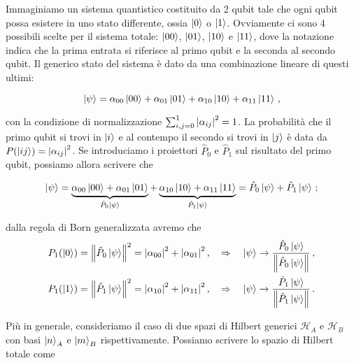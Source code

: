 \begin{esempio}
    Immaginiamo un sistema quantistico costituito da 2 qubit tale che ogni qubit possa esistere in uno stato differente, ossia $\ket{0}$ o $\ket{1}$. Ovviamente ci sono 4 possibili scelte per il sistema totale: $\ket{00}$, $\ket{01}$, $\ket{10}$ e $\ket{11}$, dove la notazione indica che la prima entrata si riferisce al primo qubit e la seconda al secondo qubit. Il generico stato del sistema è dato da una combinazione lineare di questi ultimi:
    
    \begin{equation*}
        \ket{\psi} = \alpha_{00} \ket{00} + \alpha_{01} \ket{01} + \alpha_{10} \ket{10} + \alpha_{11} \ket{11} \, ,
    \end{equation*}
    
    \noindent con la condizione di normalizzazione $\sum_{i,j=0}^1 \abs{\alpha_{ij}}^2 = 1$. La probabilità che il primo qubit si trovi in $\ket{i}$ e al contempo il secondo si trovi in $\ket{j}$ è data da $P(\ket{ij}) = \abs{\alpha_{ij}}^2$. Se introduciamo i proiettori $\hat{P}_0$ e $\hat{P}_1$ sul risultato del primo qubit, possiamo allora scrivere che
    
    \begin{equation*}
        \ket{\psi} = \underbrace{\alpha_{00} \ket{00} + \alpha_{01} \ket{01}}_{\hat{P}_0 \ket{\psi}} + \underbrace{\alpha_{10} \ket{10} + \alpha_{11} \ket{11}}_{\hat{P}_1 \ket{\psi}} = \hat{P}_0 \ket{\psi} + \hat{P}_1 \ket{\psi} \, ;
    \end{equation*}
    
        \noindent dalla regola di Born generalizzata avremo che
        \begin{align*}
            P_1(\ket{0}) &= \norm{\hat{P}_0 \ket{\psi}}^2 = \abs{\alpha_{00}}^2 + \abs{\alpha_{01}}^2 \, , \quad \Rightarrow \quad \ket{\psi} \rightarrow \frac{\hat{P}_0 \ket{\psi}}{\norm{\hat{P}_0 \ket{\psi}}} \, , \\
            P_1(\ket{1}) &= \norm{\hat{P}_1 \ket{\psi}}^2 = \abs{\alpha_{10}}^2 + \abs{\alpha_{11}}^2 \, , \quad \Rightarrow \quad \ket{\psi} \rightarrow \frac{\hat{P}_1 \ket{\psi}}{\norm{\hat{P}_1 \ket{\psi}}} \, .
        \end{align*}
\end{esempio}

\noindent Più in generale, consideriamo il caso di due spazi di Hilbert generici $\mathcal{H}_A$ e $\mathcal{H}_B$ con basi $\ket{n}_A$ e $\ket{m}_B$ rispettivamente. Possiamo scrivere lo spazio di Hilbert totale come 

